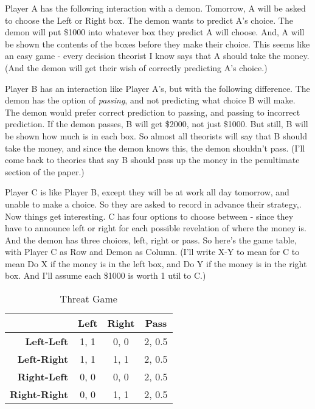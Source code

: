 \documentclass[
  12pt,
]{article}
\begin{document}
Player A has the following interaction with a demon. Tomorrow, A will be
asked to choose the Left or Right box. The demon wants to predict A's
choice. The demon will put \$1000 into whatever box they predict A will
choose. And, A will be shown the contents of the boxes before they make
their choice. This seems like an easy game - every decision theorist I
know says that A should take the money. (And the demon will get their
wish of correctly predicting A's choice.)

Player B has an interaction like Player A's, but with the following
difference. The demon has the option of \emph{passing}, and not
predicting what choice B will make. The demon would prefer correct
prediction to passing, and passing to incorrect prediction. If the demon
passes, B will get \$2000, not just \$1000. But still, B will be shown
how much is in each box. So almost all theorists will say that B should
take the money, and since the demon knows this, the demon shouldn't
pass. (I'll come back to theories that say B should pass up the money in
the penultimate section of the paper.)

Player C is like Player B, except they will be at work all day tomorrow,
and unable to make a choice. So they are asked to record in advance
their strategy,. Now things get interesting. C has four options to
choose between - since they have to announce left or right for each
possible revelation of where the money is. And the demon has three
choices, left, right or pass. So here's the game table, with Player C as
Row and Demon as Column. (I'll write X-Y to mean for C to mean Do X if
the money is in the left box, and Do Y if the money is in the right box.
And I'll assume each \$1000 is worth 1 util to C.)

\begin{table}[H]

\caption{\label{tab:unnamed-chunk-11}Threat Game}
\centering
\begin{tabular}[t]{>{}r|ccc}

\textbf{} & \textbf{Left} & \textbf{Right} & \textbf{Pass}\\
\midrule
\textbf{Left-Left} & 1, 1 & 0, 0 & 2, 0.5\\
\textbf{Left-Right} & 1, 1 & 1, 1 & 2, 0.5\\
\textbf{Right-Left} & 0, 0 & 0, 0 & 2, 0.5\\
\textbf{Right-Right} & 0, 0 & 1, 1 & 2, 0.5\\

\end{tabular}
\end{table}
\end{document}
